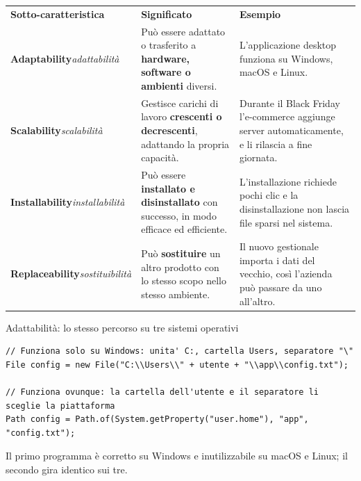 \begin{table}[H]
\centering
\renewcommand{\arraystretch}{1.4}
\begin{tabularx}{\textwidth}{P{3.6cm} L L}
\textbf{Sotto-caratteristica} & \textbf{Significato} & \textbf{Esempio} \\
\textbf{Adaptability}\newline\textit{\small adattabilità} & Può essere adattato o trasferito a \textbf{hardware, software o ambienti} diversi. & L'applicazione desktop funziona su Windows, macOS e Linux. \\
\textbf{Scalability}\newline\textit{\small scalabilità} & Gestisce carichi di lavoro \textbf{crescenti o decrescenti}, adattando la propria capacità. & Durante il Black Friday l'e-commerce aggiunge server automaticamente, e li rilascia a fine giornata. \\
\textbf{Installability}\newline\textit{\small installabilità} & Può essere \textbf{installato e disinstallato} con successo, in modo efficace ed efficiente. & L'installazione richiede pochi clic e la disinstallazione non lascia file sparsi nel sistema. \\
\textbf{Replaceability}\newline\textit{\small sostituibilità} & Può \textbf{sostituire} un altro prodotto con lo stesso scopo nello stesso ambiente. & Il nuovo gestionale importa i dati del vecchio, così l'azienda può passare da uno all'altro. \\
\bottomrule
\end{tabularx}
\end{table}

\begin{esempio}{Adattabilità: lo stesso percorso su tre sistemi operativi}
\begin{lstlisting}[style=java, name=Configurazione.java]
// Funziona solo su Windows: unita' C:, cartella Users, separatore "\"
File config = new File("C:\\Users\\" + utente + "\\app\\config.txt");

// Funziona ovunque: la cartella dell'utente e il separatore li sceglie la piattaforma
Path config = Path.of(System.getProperty("user.home"), "app", "config.txt");
\end{lstlisting}
Il primo programma è corretto su Windows e inutilizzabile su macOS e Linux; il secondo gira identico sui tre.
\end{esempio}

